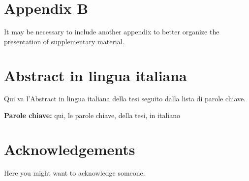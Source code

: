 \documentclass[11pt,a4paper]{article}
\begin{document}
\section{Appendix B}

    It may be necessary to include another appendix to better organize the presentation of supplementary material.

\cleardoublepage

\section*{Abstract in lingua italiana}
    Qui va l'Abstract in lingua italiana della tesi seguito dalla lista di parole chiave.
    
    \vspace{15pt}
    \begin{tcolorbox}[arc=0pt, boxrule=0pt, colback=bluePoli!60, width=\textwidth, colupper=white]
        \textbf{Parole chiave:} qui, le parole chiave, della tesi, in italiano 
    \end{tcolorbox}

\section*{Acknowledgements}
    Here you might want to acknowledge someone.

\end{document}
